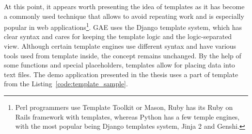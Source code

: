 At this point, it appears worth presenting the idea of templates as it has become a commonly used technique that allows to avoid repeating work and is especially popular in web applications\footnote{Perl programmers use Template Toolkit or Mason, Ruby has its Ruby on Rails framework with templates, whereas Python has a few temple engines, with the most popular being Django templates system, Jinja 2 and Genshi.}. GAE uses the Django template system, which has clear syntax and cares for keeping the template logic and the logic-separated view. Although certain template engines use different syntax and have various tools used from template inside, the concept remains unchanged. By the help of some functions and special placeholders, templates allow for placing data into text files. The demo application presented in the thesis uses a part of template from the Listing~\ref{code:template_sample}. 


